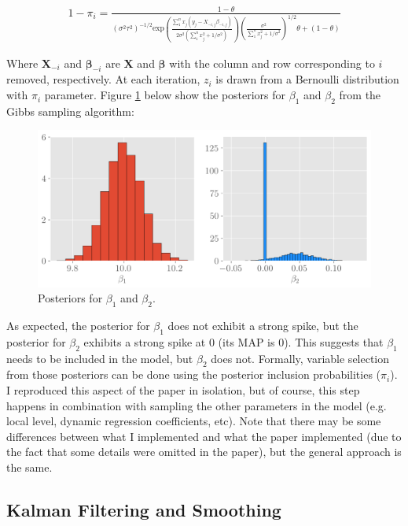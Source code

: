 \documentclass[12pt]{article}
\begin{document}
\begin{align}
    1-\pi_i = \frac{1-\theta}{(\sigma^2\tau^2)^{-1/2}\text{exp}\left(\frac{\sum_1^n x_j(y_j - X_{-i, j}\beta_{-i, j})}{2\sigma^2(\sum_1^n x_j^2 + 1/\sigma^2)}\right)  \left(\frac{\sigma^2}{\sum_1^n x_j^2 + 1/\sigma^2}\right)^{1/2}\theta   + (1-\theta)  }
\end{align}

Where $\boldsymbol{X}_{-i}$ and $\boldsymbol{\beta}_{-i}$ are $\boldsymbol{X}$ and $\boldsymbol{\beta}$ with the column and row corresponding to $i$ removed, respectively. At each iteration, $z_i$ is drawn from a Bernoulli distribution with $\pi_i$ parameter. Figure \ref{post} below show the posteriors for $\beta_1$ and $\beta_2$ from the Gibbs sampling algorithm:

\begin{figure}[!h]
    \centering
    \includegraphics[scale=.6
    ]{../figures/posteriors.png}
    \caption{Posteriors for $\beta_1$ and $\beta_2$.}
    \label{post}
\end{figure}

As expected, the posterior for $\beta_1$ does not exhibit a strong spike, but the posterior for  $\beta_2$ exhibits a strong spike at 0 (its MAP is 0). This suggests that $\beta_1$ needs to be included in the model, but $\beta_2$ does not. Formally, variable selection from those posteriors can be done using the posterior inclusion probabilities ($\pi_i$). I reproduced this aspect of the paper in isolation, but of course, this step happens in combination with sampling the other parameters in the model (e.g. local level, dynamic regression coefficients, etc). Note that there may be some differences between what I implemented and what the paper implemented (due to the fact that some details were omitted in the paper), but the general approach is the same. 

\subsection{Kalman Filtering and Smoothing}
\end{document}
